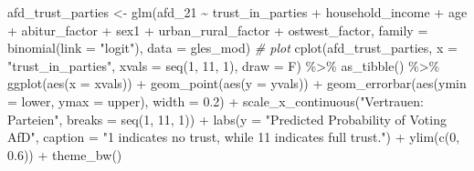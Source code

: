 \documentclass[
]{article}
\newenvironment{Shaded}{\begin{snugshade}}{\end{snugshade}}
\newcommand{\AttributeTok}[1]{\textcolor[rgb]{0.77,0.63,0.00}{#1}}
\newcommand{\CommentTok}[1]{\textcolor[rgb]{0.56,0.35,0.01}{\textit{#1}}}
\newcommand{\DecValTok}[1]{\textcolor[rgb]{0.00,0.00,0.81}{#1}}
\newcommand{\FloatTok}[1]{\textcolor[rgb]{0.00,0.00,0.81}{#1}}
\newcommand{\FunctionTok}[1]{\textcolor[rgb]{0.00,0.00,0.00}{#1}}
\newcommand{\NormalTok}[1]{#1}
\newcommand{\OtherTok}[1]{\textcolor[rgb]{0.56,0.35,0.01}{#1}}
\newcommand{\SpecialCharTok}[1]{\textcolor[rgb]{0.00,0.00,0.00}{#1}}
\newcommand{\StringTok}[1]{\textcolor[rgb]{0.31,0.60,0.02}{#1}}
\begin{document}
\begin{Shaded}
\begin{Highlighting}[]
\NormalTok{afd\_trust\_parties }\OtherTok{\textless{}{-}} \FunctionTok{glm}\NormalTok{(afd\_21 }\SpecialCharTok{\textasciitilde{}}\NormalTok{ trust\_in\_parties }\SpecialCharTok{+}\NormalTok{ household\_income }\SpecialCharTok{+}\NormalTok{ age }\SpecialCharTok{+}\NormalTok{ abitur\_factor }\SpecialCharTok{+}\NormalTok{ sex1 }\SpecialCharTok{+}\NormalTok{ urban\_rural\_factor }\SpecialCharTok{+}\NormalTok{ ostwest\_factor, }\AttributeTok{family =} \FunctionTok{binomial}\NormalTok{(}\AttributeTok{link =} \StringTok{"logit"}\NormalTok{), }\AttributeTok{data =}\NormalTok{ gles\_mod)}
\CommentTok{\# plot }
\FunctionTok{cplot}\NormalTok{(afd\_trust\_parties, }\AttributeTok{x =} \StringTok{"trust\_in\_parties"}\NormalTok{,}
      \AttributeTok{xvals =} \FunctionTok{seq}\NormalTok{(}\DecValTok{1}\NormalTok{, }\DecValTok{11}\NormalTok{, }\DecValTok{1}\NormalTok{), }\AttributeTok{draw =}\NormalTok{ F) }\SpecialCharTok{\%\textgreater{}\%}
  \FunctionTok{as\_tibble}\NormalTok{() }\SpecialCharTok{\%\textgreater{}\%}
  \FunctionTok{ggplot}\NormalTok{(}\FunctionTok{aes}\NormalTok{(}\AttributeTok{x =}\NormalTok{ xvals)) }\SpecialCharTok{+}
  \FunctionTok{geom\_point}\NormalTok{(}\FunctionTok{aes}\NormalTok{(}\AttributeTok{y =}\NormalTok{ yvals)) }\SpecialCharTok{+}
  \FunctionTok{geom\_errorbar}\NormalTok{(}\FunctionTok{aes}\NormalTok{(}\AttributeTok{ymin =}\NormalTok{ lower, }\AttributeTok{ymax =}\NormalTok{ upper), }\AttributeTok{width =} \FloatTok{0.2}\NormalTok{) }\SpecialCharTok{+}
  \FunctionTok{scale\_x\_continuous}\NormalTok{(}\StringTok{"Vertrauen: Parteien"}\NormalTok{, }
                     \AttributeTok{breaks =} \FunctionTok{seq}\NormalTok{(}\DecValTok{1}\NormalTok{, }\DecValTok{11}\NormalTok{, }\DecValTok{1}\NormalTok{)) }\SpecialCharTok{+}
  \FunctionTok{labs}\NormalTok{(}\AttributeTok{y =} \StringTok{"Predicted Probability of Voting AfD"}\NormalTok{, }
       \AttributeTok{caption =} \StringTok{"\textquotesingle{}1\textquotesingle{} indicates \textquotesingle{}no trust\textquotesingle{}, while 11 indicates \textquotesingle{}full trust\textquotesingle{}."}\NormalTok{) }\SpecialCharTok{+}
  \FunctionTok{ylim}\NormalTok{(}\FunctionTok{c}\NormalTok{(}\DecValTok{0}\NormalTok{, }\FloatTok{0.6}\NormalTok{)) }\SpecialCharTok{+}
  \FunctionTok{theme\_bw}\NormalTok{()}
\end{Highlighting}
\end{Shaded}
\end{document}
